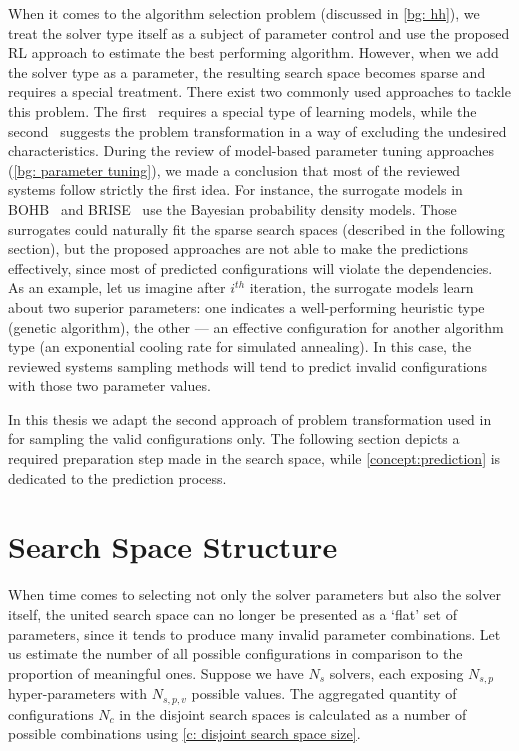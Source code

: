 When it comes to the algorithm selection problem (discussed in \cref{bg: hh}), we treat the solver type itself as a subject of parameter control and use the proposed RL approach to estimate the best performing algorithm. However, when we add the solver type as a parameter, the resulting search space becomes sparse and requires a special treatment. There exist two commonly used approaches to tackle this problem. The first~\cite{hutter2011sequential,falkner2018bohb,brise2spl} requires a special type of learning models, while the second~\cite{lopez2016irace} suggests the problem transformation in a way of excluding the undesired characteristics. During the review of model-based parameter tuning approaches (\cref{bg: parameter tuning}), we made a conclusion that most of the reviewed systems follow strictly the first idea. For instance, the surrogate models in BOHB~\cite{falkner2018bohb} and BRISE~\cite{brise2spl} use the Bayesian probability density models. Those surrogates could naturally fit the sparse search spaces (described in the following section), but the proposed approaches are not able to make the predictions effectively, since most of predicted configurations will violate the dependencies. As an example, let us imagine after $i^{th}$ iteration, the surrogate models learn about two superior parameters: one indicates a well-performing heuristic type (genetic algorithm), the other — an effective configuration for another algorithm type (an exponential cooling rate for simulated annealing). In this case, the reviewed systems sampling methods will tend to predict invalid configurations with those two parameter values.

In this thesis we adapt the second approach of problem transformation used in~\cite{lopez2016irace} for sampling the valid configurations only. The following section depicts a required preparation step made in the search space, while \cref{concept:prediction} is dedicated to the prediction process.


\section{Search Space Structure}\label{concept:search space}
When time comes to selecting not only the solver parameters but also the solver itself, the united search space can no longer be presented as a `flat' set of parameters, since it tends to produce many invalid parameter combinations. Let us estimate the number of all possible configurations in comparison to the proportion of meaningful ones. Suppose we have $N_s$ solvers, each exposing $N_{s,p}$ hyper-parameters with $N_{s,p,v}$ possible values. The aggregated quantity of configurations $N_c$ in the disjoint search spaces is calculated as a number of possible combinations using \cref{c: disjoint search space size}.

